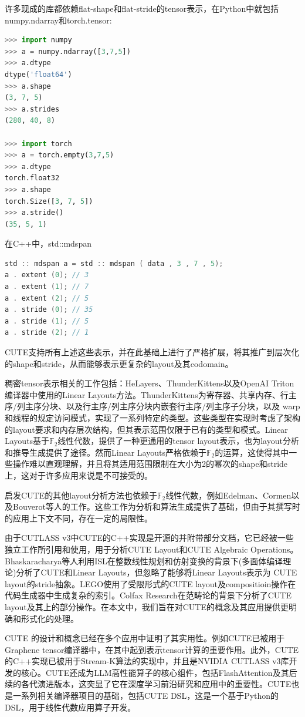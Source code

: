 \documentclass{article}
\begin{document}
许多现成的库都依赖flat-shape和flat-stride的tensor表示，在Python中就包括numpy.ndarray和torch.tensor:
\begin{lstlisting}[language=Python, basicstyle=\ttfamily\small]
>>> import numpy
>>> a = numpy.ndarray([3,7,5])
>>> a.dtype
dtype('float64')
>>> a.shape
(3, 7, 5)
>>> a.strides
(280, 40, 8)

>>> import torch
>>> a = torch.empty(3,7,5)
>>> a.dtype
torch.float32
>>> a.shape
torch.Size([3, 7, 5])
>>> a.stride()
(35, 5, 1)
\end{lstlisting}
在C++中，std::mdspan
\begin{lstlisting}[language=C++]
std :: mdspan a = std :: mdspan ( data , 3 , 7 , 5);
a . extent (0); // 3
a . extent (1); // 7
a . extent (2); // 5
a . stride (0); // 35
a . stride (1); // 5
a . stride (2); // 1
\end{lstlisting}
CUTE支持所有上述这些表示，并在此基础上进行了严格扩展，将其推广到层次化的shape和stride，从而能够表示更复杂的layout及其codomain。

稠密tensor表示相关的工作包括：HeLayers、ThunderKittens以及OpenAI Triton编译器中使用的Linear Layouts方法。ThunderKittens为寄存器、共享内存、行主序/列主序分块、以及行主序/列主序分块内嵌套行主序/列主序子分块，以及 warp和线程的规定访问模式，实现了一系列特定的类型。这些类型在实现时考虑了架构的layout要求和内存层次结构，但其表示范围仅限于已有的类型和模式。Linear Layouts基于$\mathbb{F}_2$线性代数，提供了一种更通用的tensor layout表示，也为layout分析和推导生成提供了途径。然而Linear Layouts严格依赖于$\mathbb{F}_2$的运算，这使得其中一些操作难以直观理解，并且将其适用范围限制在大小为2的幂次的shape和stride上，这对于许多应用来说是不可接受的。

启发CUTE的其他layout分析方法也依赖于$\mathbb{F}_2$线性代数，例如Edelman、Cormen以及Bouverot等人的工作。这些工作为分析和算法生成提供了基础，但由于其撰写时的应用上下文不同，存在一定的局限性。

由于CUTLASS v3中CUTE的C++实现是开源的并附带部分文档，它已经被一些独立工作所引用和使用，用于分析CUTE Layout和CUTE Algebraic Operations。Bhaskaracharya等人利用ISL在整数线性规划和仿射变换的背景下(多面体编译理论)分析了CUTE和Linear Layouts，但忽略了能够将Linear Layouts表示为 CUTE layout的stride抽象。LEGO使用了受限形式的CUTE layout及compositioin操作在代码生成器中生成复杂的索引。Colfax Research在范畴论的背景下分析了CUTE layout及其上的部分操作。在本文中，我们旨在对CUTE的概念及其应用提供更明确和形式化的处理。

CUTE 的设计和概念已经在多个应用中证明了其实用性。例如CUTE已被用于 Graphene tensor编译器中，在其中起到表示tensor计算的重要作用。此外，CUTE的C++实现已被用于Stream-K算法的实现中，并且是NVIDIA CUTLASS v3库开发的核心。CUTE还成为LLM高性能算子的核心组件，包括FlashAttention及其后续的各代演进版本，这突显了它在深度学习前沿研究和应用中的重要性。CUTE也是一系列相关编译器项目的基础，包括CUTE DSL，这是一个基于Python的DSL，用于线性代数应用算子开发。
\end{document}
